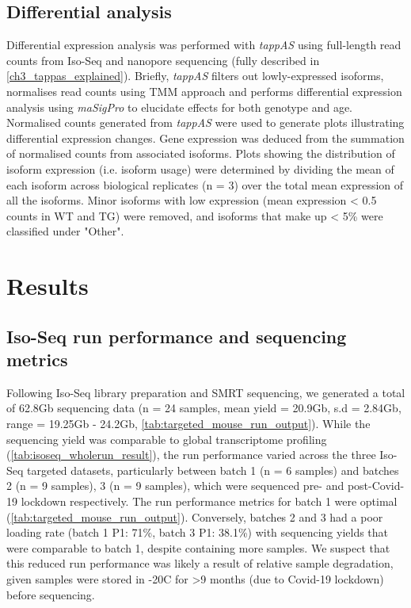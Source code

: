 \newpage
\subsection{Differential analysis}
Differential expression analysis was performed with \textit{tappAS} using full-length read counts from Iso-Seq and nanopore sequencing (fully described in \cref{ch3_tappas_explained}). Briefly, \textit{tappAS} filters out lowly-expressed isoforms, normalises read counts using TMM approach and performs differential expression analysis using \textit{maSigPro}\cite{Conesa2006,Nueda2014,Conesa2017} to elucidate effects for both genotype and age. Normalised counts generated from \textit{tappAS} were used to generate plots illustrating differential expression changes. Gene expression was deduced from the summation of normalised counts from associated isoforms. Plots showing the distribution of isoform expression (i.e. isoform usage) were determined by dividing the mean of each isoform across biological replicates (n = 3) over the total mean expression of all the isoforms. Minor isoforms with low expression (mean expression < 0.5 counts in WT and TG) were removed, and isoforms that make up < 5\% were classified under "Other". 

\newpage
\section{Results}
\subsection{Iso-Seq run performance and sequencing metrics}
Following Iso-Seq library preparation and SMRT sequencing, we generated a total of 62.8Gb sequencing data (n = 24 samples, mean yield = 20.9Gb, s.d = 2.84Gb, range = 19.25Gb - 24.2Gb, \cref{tab:targeted_mouse_run_output}). While the sequencing yield was comparable to global transcriptome profiling (\cref{tab:isoseq_wholerun_result}), the run performance varied across the three Iso-Seq targeted datasets, particularly between batch 1 (n = 6 samples) and batches 2 (n = 9 samples), 3 (n = 9 samples), which were sequenced pre- and post-Covid-19 lockdown respectively. The run performance metrics for batch 1 were optimal (\cref{tab:targeted_mouse_run_output}). Conversely, batches 2 and 3 had a poor loading rate (batch 1 P1:  71\%, batch 3 P1: 38.1\%) with sequencing yields that were comparable to batch 1, despite containing more samples. We suspect that this reduced run performance was likely a result of relative sample degradation, given samples were stored in -20\textdegree C for >9 months (due to Covid-19 lockdown) before sequencing. 


